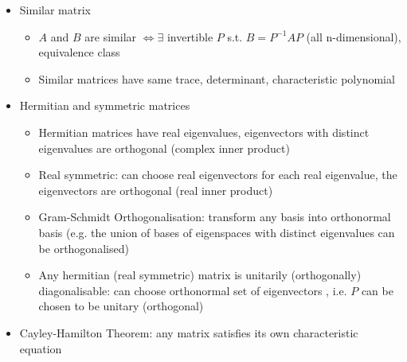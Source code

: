 \begin{itemize}
\begin{itemize}
            \end{itemize}
      \item Similar matrix
            \begin{itemize}
                  \item $A$ and $B$ are similar $\iff\exists$ invertible $P$ s.t. $B=P^{-1}AP$
                        (all n-dimensional), equivalence class
                  \item Similar matrices have same trace, determinant, characteristic polynomial
            \end{itemize}
      \item Hermitian and symmetric matrices
            \begin{itemize}
                  \item Hermitian matrices have real eigenvalues, eigenvectors with distinct
                        eigenvalues are orthogonal (complex inner product)
                  \item Real symmetric: can choose real eigenvectors for each real eigenvalue,
                        the eigenvectors are orthogonal (real inner product)
                  \item Gram-Schmidt Orthogonalisation: transform any basis into orthonormal
                        basis (e.g. the union of bases of eigenspaces with distinct eigenvalues
                        can be orthogonalised)
                  \item Any hermitian (real symmetric) matrix is unitarily (orthogonally)
                        diagonalisable: can choose orthonormal set of eigenvectors , i.e.
                        $P$ can be chosen to be unitary (orthogonal)
            \end{itemize}
      \item Cayley-Hamilton Theorem: any matrix satisfies its own characteristic
            equation
\end{itemize}

